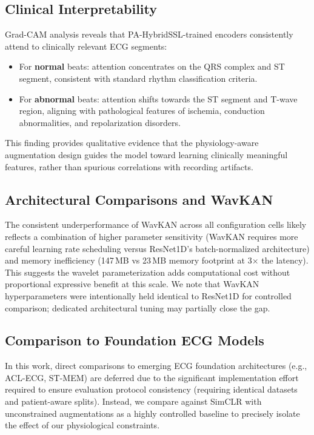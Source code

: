 \documentclass[journal,10pt]{IEEEtran}
\begin{document}
\subsection{Clinical Interpretability}

Grad-CAM analysis reveals that PA-HybridSSL-trained encoders consistently attend to clinically relevant ECG segments:
\begin{itemize}
    \item For \textbf{normal} beats: attention concentrates on the QRS complex and ST segment, consistent with standard rhythm classification criteria.
    \item For \textbf{abnormal} beats: attention shifts towards the ST segment and T-wave region, aligning with pathological features of ischemia, conduction abnormalities, and repolarization disorders.
\end{itemize}

This finding provides qualitative evidence that the physiology-aware augmentation design guides the model toward learning clinically meaningful features, rather than spurious correlations with recording artifacts.

\subsection{Architectural Comparisons and WavKAN}

The consistent underperformance of WavKAN across all configuration cells likely reflects a combination of higher parameter sensitivity (WavKAN requires more careful learning rate scheduling versus ResNet1D's batch-normalized architecture) and memory inefficiency (147\,MB vs 23\,MB memory footprint at 3$\times$ the latency). This suggests the wavelet parameterization adds computational cost without proportional expressive benefit at this scale. We note that WavKAN hyperparameters were intentionally held identical to ResNet1D for controlled comparison; dedicated architectural tuning may partially close the gap.

\subsection{Comparison to Foundation ECG Models}

In this work, direct comparisons to emerging ECG foundation architectures (e.g., ACL-ECG, ST-MEM) are deferred due to the significant implementation effort required to ensure evaluation protocol consistency (requiring identical datasets and patient-aware splits). Instead, we compare against SimCLR with unconstrained augmentations as a highly controlled baseline to precisely isolate the effect of our physiological constraints.
\end{document}
